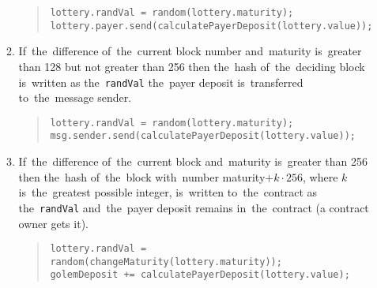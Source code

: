 \documentclass[a4paper]{article}
\begin{document}
\begin{enumerate}
\begin{enumerate}
\begin{quote}
                  \verb!lottery.randVal = random(lottery.maturity);!\\
                  \verb!lottery.payer.send(calculatePayerDeposit(lottery.value));!
                \end{quote}
            \item If~the~difference of~the~current block number and~maturity is~greater than 128 but not greater than
                256 then  the~hash of~the~deciding block is~written as the~\texttt{randVal} the~payer deposit
                is~transferred to~the~message sender.
                \begin{quote}
                  \verb!lottery.randVal = random(lottery.maturity);!\\
                  \verb!msg.sender.send(calculatePayerDeposit(lottery.value));!
                \end{quote}
            \item If~the~difference of~the~current block and~maturity is~greater than 256 then the~hash of~the~block
            with~number maturity$+k \cdot 256$, where $k$ is~the~greatest possible integer, is~written to~the~contract
            as the~\texttt{randVal} and~the~payer deposit remains in~the~contract (a contract owner gets it).
            \begin{quote}
              \verb!lottery.randVal = random(changeMaturity(lottery.maturity));!\\
	      \verb!golemDeposit += calculatePayerDeposit(lottery.value);!
	    \end{quote}
        \end{enumerate}


\end{enumerate}
\end{document}
